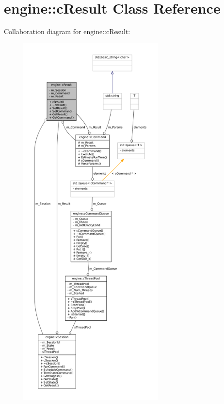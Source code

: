 \hypertarget{classengine_1_1cResult}{
\section{engine\-:\-:c\-Result \-Class \-Reference}
\label{classengine_1_1cResult}
}


\-Collaboration diagram for engine\-:\-:c\-Result\-:\nopagebreak
\begin{figure}[H]
\begin{center}
\leavevmode
\includegraphics[height=550pt]{classengine_1_1cResult__coll__graph}
\end{center}
\end{figure}
